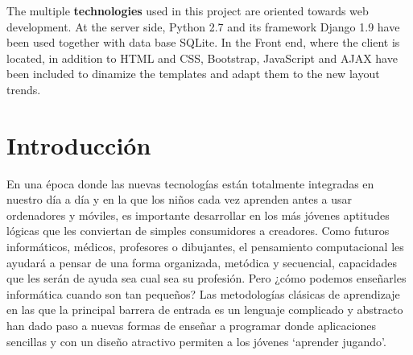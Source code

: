 \documentclass[a4paper, 12pt]{book}
\begin{document}
The multiple \textbf{technologies} used in this project are oriented towards web development. At the server side, Python 2.7 and its framework Django 1.9 have been used together with data base SQLite. In the Front end, where the client is located, in addition to HTML and CSS, Bootstrap, JavaScript and AJAX have been included to dinamize the templates and adapt them to the new layout trends.



\tableofcontents 
\cleardoublepage
\listoffigures %



\cleardoublepage
\chapter{Introducción}
\label{sec:intro} %

En una época donde las nuevas tecnologías están totalmente integradas en nuestro día a día y en la que los niños cada vez aprenden antes a usar ordenadores y móviles, es importante desarrollar en los más jóvenes aptitudes lógicas que les conviertan de simples consumidores a creadores. 
Como futuros informáticos, médicos, profesores o dibujantes, el pensamiento computacional les ayudará a pensar de una forma organizada, metódica y secuencial, capacidades que les serán de ayuda sea cual sea su profesión. Pero ¿cómo podemos enseñarles informática cuando son tan pequeños? Las metodologías clásicas de aprendizaje en las que la principal barrera de entrada es un lenguaje complicado y abstracto han dado paso a nuevas formas de enseñar a programar donde aplicaciones sencillas y con un diseño atractivo permiten a los jóvenes `aprender jugando'.
\end{document}
